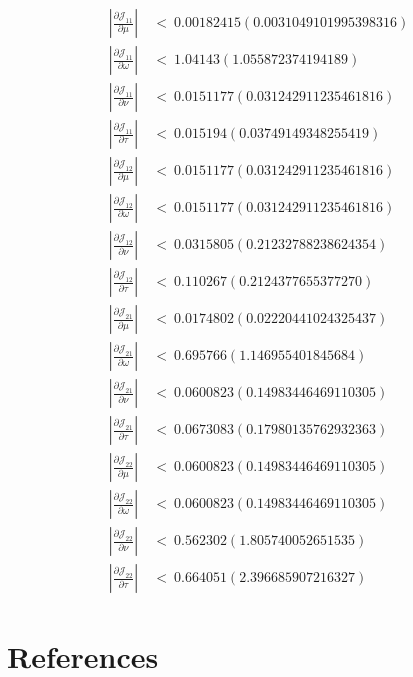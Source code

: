 \documentclass{article}
\begin{document}
\begin{align}
\left| \frac{\partial {\mathcal J}_{11}}{\partial \mu} \right| \ &< \ 0.00182415 (0.0031049101995398316) \\ \nonumber
\left| \frac{\partial {\mathcal J}_{11}}{\partial \omega} \right| \ &< \ 1.04143 (1.055872374194189) \\ \nonumber
\left| \frac{\partial {\mathcal J}_{11}}{\partial \nu} \right| \ &< \ 0.0151177 (0.031242911235461816) \\ \nonumber
\left| \frac{\partial {\mathcal J}_{11}}{\partial \tau} \right| \ &< \ 0.015194 (0.03749149348255419) \\ \nonumber
\left| \frac{\partial {\mathcal J}_{12}}{\partial \mu} \right| \ &< \ 0.0151177 (0.031242911235461816) \\ \nonumber
\left| \frac{\partial {\mathcal J}_{12}}{\partial \omega} \right| \ &< \ 0.0151177 (0.031242911235461816) \\ \nonumber
\left| \frac{\partial {\mathcal J}_{12}}{\partial \nu} \right| \ &< \ 0.0315805 (0.21232788238624354) \\ \nonumber
\left| \frac{\partial {\mathcal J}_{12}}{\partial \tau} \right| \ &< \ 0.110267 (0.2124377655377270) \\ \nonumber
\left| \frac{\partial {\mathcal J}_{21}}{\partial \mu} \right| \ &< \ 0.0174802 (0.02220441024325437) \\ \nonumber
\left| \frac{\partial {\mathcal J}_{21}}{\partial \omega} \right| \ &< \ 0.695766 (1.146955401845684) \\ \nonumber
\left| \frac{\partial {\mathcal J}_{21}}{\partial \nu} \right| \ &< \ 0.0600823 (0.14983446469110305) \\ \nonumber
\left| \frac{\partial {\mathcal J}_{21}}{\partial \tau} \right| \ &< \ 0.0673083 (0.17980135762932363) \\ \nonumber
\left| \frac{\partial {\mathcal J}_{22}}{\partial \mu} \right| \ &< \ 0.0600823 (0.14983446469110305) \\ \nonumber
\left| \frac{\partial {\mathcal J}_{22}}{\partial \omega} \right| \ &< \ 0.0600823 (0.14983446469110305) \\ \nonumber
\left| \frac{\partial {\mathcal J}_{22}}{\partial \nu} \right| \ &< \ 0.562302 (1.805740052651535) \\ \nonumber
\left| \frac{\partial {\mathcal J}_{22}}{\partial \tau} \right| \ &< \ 0.664051 (2.396685907216327)
\end{align}

\section{References}
\label{sec:references}
 
 

\listoffigures
{}
\listoftables

\newpage
{}
\printindex 
\end{document}
